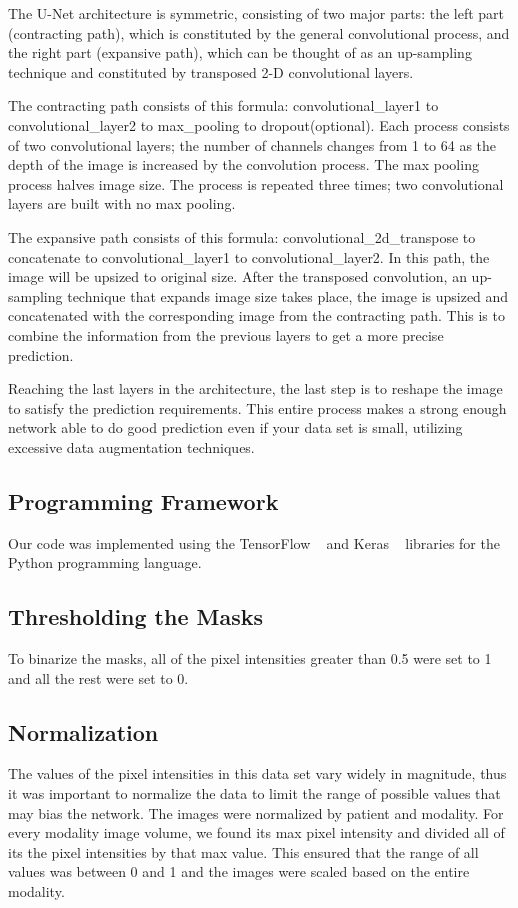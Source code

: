 \documentclass[conference]{IEEEtran}
\begin{document}
\par The U-Net architecture is symmetric, consisting of two major parts: the left part (contracting path), which is constituted by the general convolutional process, and the right part (expansive path), which can be thought of as an up-sampling technique and constituted by transposed 2-D convolutional layers. \par The contracting path consists of this formula: convolutional\_layer1 to convolutional\_layer2 to max\_pooling to dropout(optional). Each process consists of two convolutional layers; the number of channels changes from 1 to 64 as the depth of the image is increased by the convolution process. The max pooling process halves image size. The process is repeated three times; two convolutional layers are built with no max pooling.\par The expansive path consists of this formula: convolutional\_2d\_transpose to concatenate to convolutional\_layer1 to convolutional\_layer2. In this path, the image will be upsized to original size. After the transposed convolution, an up-sampling technique that expands image size takes place, the image is upsized and concatenated with the corresponding image from the contracting path. This is to combine the information from the previous layers to get a more precise prediction. \par Reaching the last layers in the architecture, the last step is to reshape the image to satisfy the prediction requirements. This entire process makes a strong enough network able to do good prediction even if your data set is small, utilizing excessive data augmentation techniques.

\subsection{Programming Framework}
Our code was implemented using the TensorFlow ~\cite{tensorflow2015-whitepaper} and Keras ~\cite{chollet2015keras} libraries for the Python programming language.

\subsection{Thresholding the Masks}
To binarize the masks, all of the pixel intensities greater than 0.5 were set to 1 and all the rest were set to 0.

\subsection{Normalization}
The values of the pixel intensities in this data set vary widely in magnitude, thus it was important to normalize the data to limit the range of possible values that may bias the network. The images were normalized by patient and modality. For every modality image volume, we found its max pixel intensity and divided all of its the pixel intensities by that max value. This ensured that the range of all values was between 0 and 1 and the images were scaled based on the entire modality.
\end{document}
